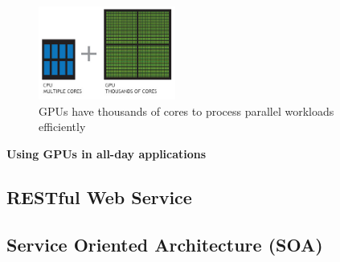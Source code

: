 \documentclass[11pt, a4paper]{article}
\begin{document}
\begin{figure}[h!]
	\centering
	\includegraphics[width=0.4\textwidth]{cpu-and-gpu}
	\caption{GPUs have thousands of cores to process parallel workloads efficiently \cite{cpu-vs-gpu}}
\end{figure}

\newpage
\textbf{Using GPUs in all-day applications}



\newpage
\subsection{RESTful Web Service}
\subsection{Service Oriented Architecture (SOA)}

\newpage
\nocite{*}

{}
\end{document}
